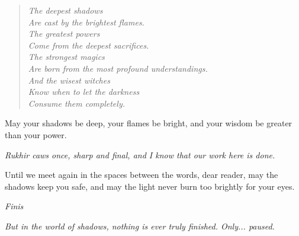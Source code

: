 \documentclass[12pt,twoside]{book}
\newcommand{\shadow}[1]{\textit{#1}}
\begin{document}
\begin{verse}
\textit{The deepest shadows} \\
\textit{Are cast by the brightest flames.} \\
\textit{The greatest powers} \\
\textit{Come from the deepest sacrifices.} \\
\textit{The strongest magics} \\
\textit{Are born from the most profound understandings.} \\
\textit{And the wisest witches} \\
\textit{Know when to let the darkness} \\
\textit{Consume them completely.}
\end{verse}

May your shadows be deep, your flames be bright, and your wisdom be greater than your power.

\shadow{Rukhir caws once, sharp and final, and I know that our work here is done.}

Until we meet again in the spaces between the words, dear reader, may the shadows keep you safe, and may the light never burn too brightly for your eyes.

\begin{center}
\textit{Finis}
\end{center}

\shadow{But in the world of shadows, nothing is ever truly finished. Only... paused.}
\end{document}
